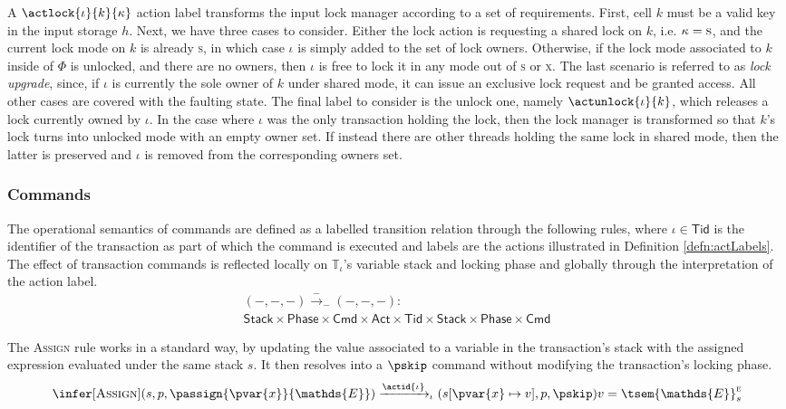 A $\actlock{\iota}{k}{\kappa}$ action label transforms the input lock manager according to a set of requirements. First, cell $k$ must be a valid key in the input storage $h$. Next, we have three cases to consider. Either the lock action is requesting a shared lock on $k$, i.e. $\kappa = \textsc{s}$, and the current lock mode on $k$ is already \textsc{s}, in which case $\iota$ is simply added to the set of lock owners. Otherwise, if the lock mode associated to $k$ inside of $\Phi$ is unlocked, and there are no owners, then $\iota$ is free to lock it in any mode out of \textsc{s} or \textsc{x}. The last scenario is referred to as \textit{lock upgrade}, since, if $\iota$ is currently the sole owner of $k$ under shared mode, it can issue an exclusive lock request and be granted access. All other cases are covered with the faulting state. The final label to consider is the unlock one, namely $\actunlock{\iota}{k}$, which releases a lock currently owned by $\iota$. In the case where $\iota$ was the only transaction holding the lock, then the lock manager is transformed so that $k$'s lock turns into unlocked mode with an empty owner set. If instead there are other threads holding the same lock in shared mode, then the latter is preserved and $\iota$ is removed from the corresponding owners set.

\subsubsection{Commands}

\label{sec:opSemCmd2pl}
	
The operational semantics of commands are defined as a labelled transition relation through the following rules, where $\iota \in \mathsf{Tid}$ is the identifier of the transaction as part of which the command is executed and labels are the actions illustrated in Definition \ref{defn:actLabels}. The effect of transaction commands is reflected locally on $\mathds{T}_\iota$'s variable stack and locking phase and globally through the interpretation of the action label.
\begin{gather*}
	(-, -, -) \xrightarrow{-}_- (-, -, -) : \\
	\mathsf{Stack} \times \mathsf{Phase} \times \mathsf{Cmd}
	\times \mathsf{Act} \times \mathsf{Tid} \times
	\mathsf{Stack} \times \mathsf{Phase} \times \mathsf{Cmd}
\end{gather*}

The \textsc{Assign} rule works in a standard way, by updating the value associated to a variable in the transaction's stack with the assigned expression evaluated under the same stack $s$. It then resolves into a $\pskip$ command without modifying the transaction's locking phase.
\[
\infer[\textsc{Assign}]
{
	(s, p, \passign{\pvar{x}}{\mathds{E}})
	\xrightarrow{\actid{\iota}}_\iota
	(s[\pvar{x} \mapsto v], p, \pskip)
}
{
	v = \tsem{\mathds{E}}^\textsc{e}_s
}
\]

